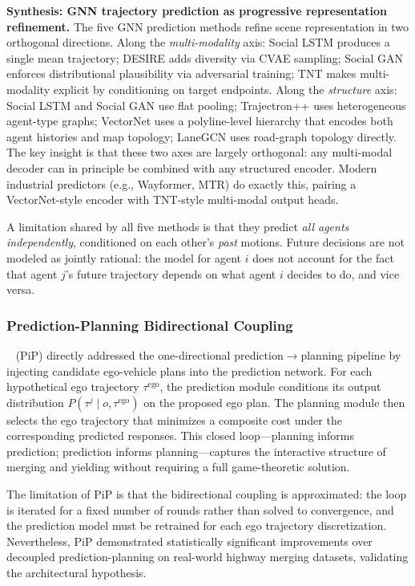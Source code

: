 \documentclass[12pt, a4paper]{article}
\begin{document}
\smallskip\noindent\textbf{Synthesis: GNN trajectory prediction as progressive representation refinement.}
The five GNN prediction methods refine scene representation in two orthogonal directions.
Along the \emph{multi-modality} axis: Social LSTM produces a single mean trajectory;
DESIRE adds diversity via CVAE sampling; Social GAN enforces distributional plausibility
via adversarial training; TNT makes multi-modality explicit by conditioning on target endpoints.
Along the \emph{structure} axis: Social LSTM and Social GAN use flat pooling;
Trajectron++ uses heterogeneous agent-type graphs; VectorNet uses a polyline-level
hierarchy that encodes both agent histories and map topology; LaneGCN uses
road-graph topology directly.  The key insight is that these two axes are
largely orthogonal: any multi-modal decoder can in principle be combined with
any structured encoder.  Modern industrial predictors (e.g., Wayformer, MTR)
do exactly this, pairing a VectorNet-style encoder with TNT-style multi-modal
output heads.

A limitation shared by all five methods is that they predict \emph{all agents
independently}, conditioned on each other's \emph{past} motions.  Future
decisions are not modeled as jointly rational: the model for agent $i$ does
not account for the fact that agent $j$'s future trajectory depends on
what agent $i$ decides to do, and vice versa.

\subsubsection{Prediction-Planning Bidirectional Coupling}

\citeauthor{song2020pip}~\cite{song2020pip} (PiP) directly addressed the
one-directional prediction$\rightarrow$planning pipeline by injecting candidate
ego-vehicle plans into the prediction network.  For each hypothetical ego
trajectory $\tau^{\text{ego}}$, the prediction module conditions its output
distribution $P(\tau^j \mid o, \tau^{\text{ego}})$ on the proposed ego plan.
The planning module then selects the ego trajectory that minimizes a composite
cost under the corresponding predicted responses.  This closed loop---planning
informs prediction; prediction informs planning---captures the interactive
structure of merging and yielding without requiring a full game-theoretic
solution.

The limitation of PiP is that the bidirectional coupling is approximated: the
loop is iterated for a fixed number of rounds rather than solved to convergence,
and the prediction model must be retrained for each ego trajectory discretization.
Nevertheless, PiP demonstrated statistically significant improvements over
decoupled prediction-planning on real-world highway merging datasets, validating
the architectural hypothesis.
\end{document}
